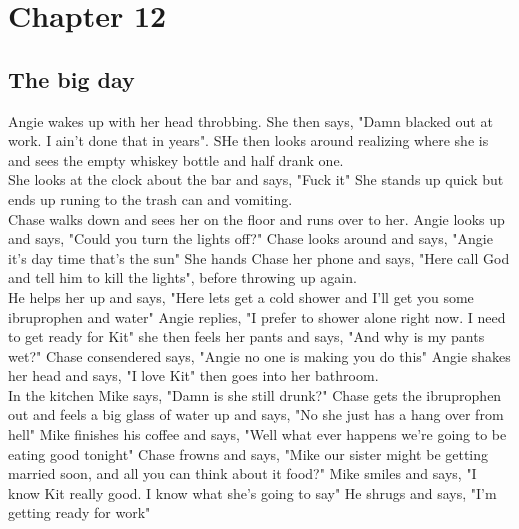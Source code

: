 \documentclass{article}[12px]
\begin{document}
\section* {Chapter 12}
\subsection* {The big day}
	Angie wakes up with her head throbbing. She then says, "Damn blacked out at work. I ain't done that in years". SHe then looks around realizing where she is and sees the empty whiskey bottle and half drank one.\\

	She looks at the clock about the bar and says, "Fuck it" She stands up quick but ends up runing to the trash can and vomiting.\\

	Chase walks down and sees her on the floor and runs over to her. Angie looks up and says, "Could you turn the lights off?" Chase looks around and says, "Angie it's day time that's the sun" She hands Chase her phone and says, "Here call God and tell him to kill the lights", before throwing up again.\\

	He  helps her up and says, "Here lets get a cold shower and I'll get you some ibruprophen and water" Angie replies, "I prefer to shower alone right now. I need to get ready for Kit" she then feels her pants and says, "And why is my pants wet?" Chase consendered says, "Angie no one is making you do this" Angie shakes her head and says, "I love Kit" then goes into her bathroom.\\

	In the kitchen Mike says, "Damn is she still drunk?" Chase gets the ibruprophen out and feels a big glass of water up and says, "No she just has a hang over from hell" Mike finishes his coffee and says, "Well what ever happens we're going to be eating good tonight" Chase frowns and says, "Mike our sister might be getting married soon, and all you can think about it food?" Mike smiles and says, "I know Kit really good. I know what she's going to say" He shrugs and says, "I'm getting ready for work"\\
\end{document}
